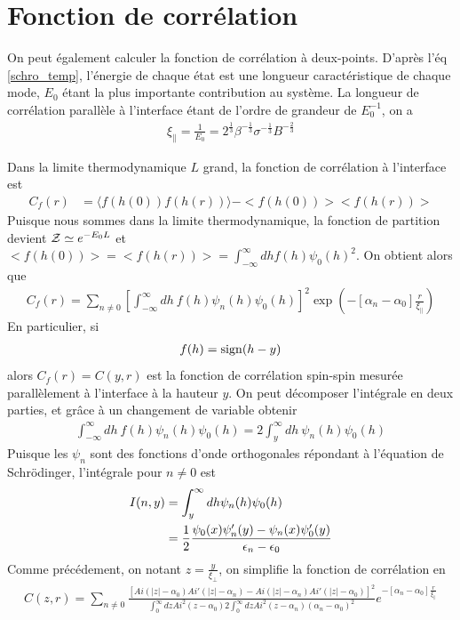     \section{Fonction de corrélation }

On peut également calculer la fonction de corrélation à deux-points. 
D'après l'éq \ref{schro_temp}, l'énergie de chaque état est une longueur caractéristique de chaque mode, $E_0$ étant la plus importante contribution au système. La longueur de corrélation parallèle à l'interface étant de l'ordre de grandeur de $E_0^{-1}$, on a 
\begin{align}
	\xi_\parallel = \frac{1}{E_0} =  2^\frac{1}{3}  \beta^{-\frac{1}{3}} \sigma^{-\frac{1}{3}}B^{-\frac{2}{3}}
\end{align}


Dans la limite thermodynamique $L$ grand, la fonction de corrélation  à l'interface est
\begin{align}
	C_f(r) &= \langle f(h(0))f(h(r))\rangle - <f(h(0))><f(h(r))>
\end{align}
Puisque nous sommes dans la limite thermodynamique, la fonction de partition devient $\mathcal{Z} \simeq e^{-E_0 L}$ et $<f(h(0))> = <f(h(r))> = \int_{-\infty}^\infty dh f(h) \psi_0(h)^2 $.
On obtient alors que
\begin{align}
	C_f(r) =  \sum_{n\neq 0}\left[\int_{-\infty} ^\infty dh\  f(h)\psi_n(h)\psi_0(h)\right]^2\exp(-[\alpha_n-\alpha_0] \frac{r}{\xi_{||}})
\end{align}
En particulier, si
\begin{align}
	f(h) = {\rm sign}(h-y)
\end{align}
alors $C_f(r)=C(y,r)$ est la fonction de corrélation spin-spin mesurée parallèlement à l'interface à la hauteur $y$. On peut décomposer l'intégrale en deux parties, et grâce à un changement de variable obtenir
\begin{align}
	\int_{-\infty} ^\infty dh\  f(h)\psi_n(h)\psi_0(h)=  2\int_y ^\infty dh\  \psi_n(h)\psi_0(h)
\end{align}
Puisque les $\psi_n$ sont des fonctions d'onde orthogonales répondant à l'équation de Schrödinger, l'intégrale pour $n\neq 0$ est
\begin{align}
	I(n,y)&= \int_y^\infty dh\psi_n(h)\psi_0(h)  \nonumber \\
	&= \frac{1}{2}\frac{\psi_0(x)\psi'_n(y) - \psi_n(x)\psi_0'(y)}{\epsilon_n-\epsilon_0}
\end{align} 
Comme précédement, on notant $z= \frac{y}{\xi_\perp}$, on simplifie la fonction de corrélation en
\begin{align}
	C(z ,r) = \sum_{n\neq 0} \frac{\left[ Ai(|z|-\alpha_0)Ai'(|z|-\alpha_n) -Ai(|z|-\alpha_n)Ai'(|z|-\alpha_0) \right]^2}
{ \int_0^\infty dz Ai^2 ( z-\alpha_0 )2 \int_0^\infty dz Ai^2 ( z-\alpha_n ) (\alpha_n-\alpha_0)^2}e^{-[\alpha_n-\alpha_0] \frac{r}{\xi_{||}}}
\end{align}

